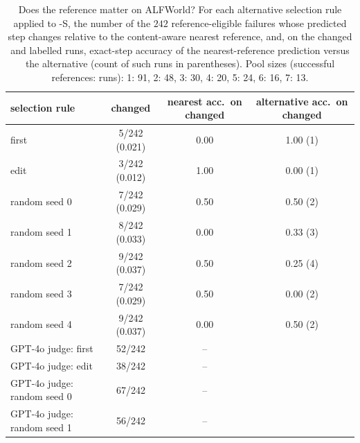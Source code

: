 \begin{table}[!t]
\caption{Does the reference matter on ALFWorld? For each alternative selection rule applied to \pha{}-S, the number of the $242$ reference-eligible failures whose predicted step changes relative to the content-aware nearest reference, and, on the changed and labelled runs, exact-step accuracy of the nearest-reference prediction versus the alternative (count of such runs in parentheses). Pool sizes (successful references: runs): 1: 91, 2: 48, 3: 30, 4: 20, 5: 24, 6: 16, 7: 13.}
\label{tab:alf-refsel}
\centering\scriptsize
\begin{tabular}{lccc}
\toprule
selection rule & changed & nearest acc.\ on changed & alternative acc.\ on changed \\
\midrule
first & 5/242 (0.021) & 0.00 & 1.00 (1) \\
edit & 3/242 (0.012) & 1.00 & 0.00 (1) \\
random seed 0 & 7/242 (0.029) & 0.50 & 0.50 (2) \\
random seed 1 & 8/242 (0.033) & 0.00 & 0.33 (3) \\
random seed 2 & 9/242 (0.037) & 0.50 & 0.25 (4) \\
random seed 3 & 7/242 (0.029) & 0.50 & 0.00 (2) \\
random seed 4 & 9/242 (0.037) & 0.00 & 0.50 (2) \\
GPT-4o judge: first & 52/242 & -- \\
GPT-4o judge: edit & 38/242 & -- \\
GPT-4o judge: random seed 0 & 67/242 & -- \\
GPT-4o judge: random seed 1 & 56/242 & -- \\
\bottomrule
\end{tabular}
\end{table}
